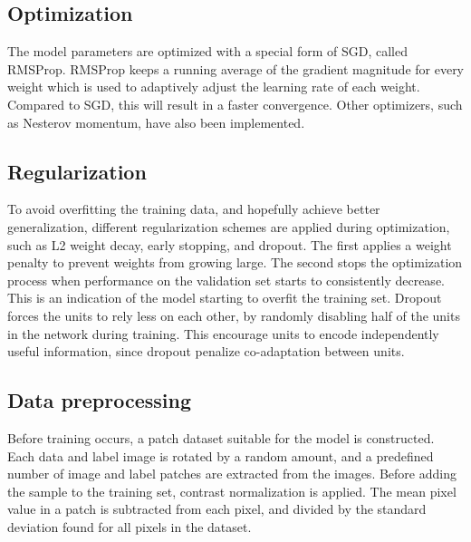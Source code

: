 \subsection{Optimization}
The model parameters are optimized with a special form of \ac{SGD}, called RMSProp. RMSProp keeps a running average of the gradient magnitude for every weight which is used to adaptively adjust the learning rate of each weight. Compared to \ac{SGD}, this will result in a faster convergence. Other optimizers, such as Nesterov momentum, have also been implemented.\\ 

\subsection{Regularization}
To avoid overfitting the training data, and hopefully achieve better generalization, different regularization schemes are applied during optimization, such as L2 weight decay, early stopping, and dropout. The first applies a weight penalty to prevent weights from growing large. The second stops the optimization process when performance on the validation set starts to consistently decrease. This is an indication of the model starting to overfit the training set. Dropout forces the units to rely less on each other, by randomly disabling half of the units in the network during training. This encourage units to encode independently useful information, since dropout penalize co-adaptation between units.\\


\subsection{Data preprocessing}

Before training occurs, a patch dataset suitable for the model is constructed. Each data and label image is rotated by a random amount, and a predefined number of image and label patches are extracted from the images. Before adding the sample to the training set, contrast normalization is applied. The mean pixel value in a patch is subtracted from each pixel, and divided by the standard deviation found for all pixels in the dataset.\\


